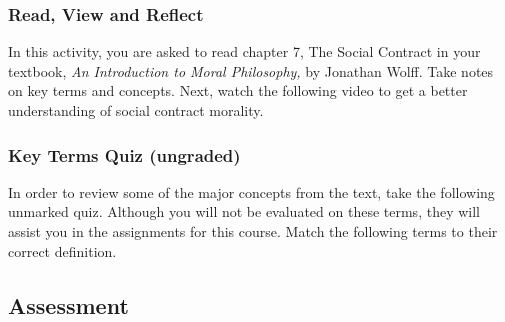 \documentclass[
]{book}
\begin{document}
\begin{reflect}
\hypertarget{read-view-and-reflect-9}{%
\subsubsection*{Read, View and Reflect}\label{read-view-and-reflect-9}}

In this activity, you are asked to read chapter 7, The Social Contract in your
textbook, \emph{An Introduction to Moral Philosophy,} by Jonathan Wolff. Take notes
on key terms and concepts.
Next, watch the following video to get a better understanding of social
contract morality.

\hypertarget{key-terms-quiz-ungraded-2}{%
\subsubsection*{Key Terms Quiz (ungraded)}\label{key-terms-quiz-ungraded-2}}

In order to review some of the major concepts from the text, take the following
unmarked quiz. Although you will not be evaluated on these terms, they will
assist you in the assignments for this course.
Match the following terms to their correct definition.
\end{reflect}

\hypertarget{assessment-2}{%
\subsection*{Assessment}\label{assessment-2}}
\end{document}
